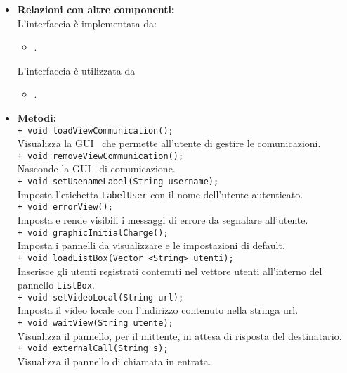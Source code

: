 {\begin{sloppypar}
{\begin{itemize}
\begin{itemize}
				\item  \textbf{Relazioni con altre componenti:} \\
					L’interfaccia è implementata da:
					\begin{itemize}
						\item {}.
					\end{itemize}
					L’interfaccia è utilizzata da
					\begin{itemize}
						\item {}.
					\end{itemize}
				\item[] \textbf{Metodi:} \\
					\texttt{+ void loadViewCommunication();} \\
					Visualizza la GUI\g~ che permette all’utente di gestire le comunicazioni.\\
					\texttt{+ void removeViewCommunication();} \\
					Nasconde la GUI\g~ di comunicazione.\\
					\texttt{+ void setUsenameLabel(String username);}\\
					Imposta l'etichetta \texttt{LabelUser} con il nome dell'utente autenticato.\\
					\texttt{+ void errorView();}\\
					Imposta e rende visibili i messaggi di errore da segnalare all’utente.\\
					\texttt{+ void graphicInitialCharge();}\\
					Imposta i pannelli da visualizzare e le impostazioni di default. \\
					\texttt{+ void loadListBox(Vector <String> utenti);}\\
					Inserisce gli utenti registrati contenuti nel vettore utenti all’interno del pannello 
					\texttt{ListBox}.\\
					\texttt{+ void setVideoLocal(String url);}\\
					Imposta il video locale con l’indirizzo contenuto nella stringa url.\\
					\texttt{+ void waitView(String utente);}\\
					Visualizza il pannello, per il mittente, in attesa di risposta del destinatario.\\
					\texttt{+ void externalCall(String s);}\\
					Visualizza il pannello di chiamata in entrata.\\

\end{itemize}
\end{itemize}}
\end{sloppypar}}
